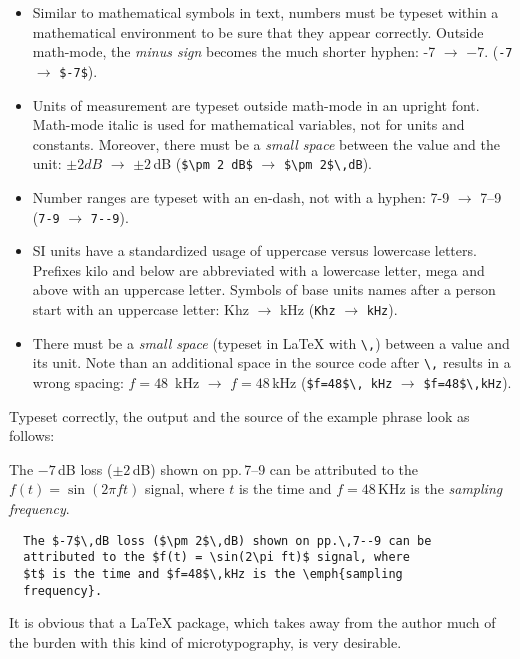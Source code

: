 \documentclass[12pt, a4paper]{scrartcl}
\begin{document}
\begin{itemize}
  \item Similar to mathematical symbols in text, numbers must be typeset
    within a mathematical environment to be sure that they appear
    correctly. Outside math-mode, the \emph{minus sign} becomes the much
    shorter hyphen: -7 $\rightarrow$ $-7$. (\verb|-7| $\rightarrow$
    \verb|$-7$|).
  \item Units of measurement are typeset outside math-mode in an
    upright font. Math-mode italic is used for mathematical variables,
    not for units and constants. Moreover, there must be a \emph{small
    space} between the value and the unit: $\pm 2 dB$ $\rightarrow$
    $\pm 2$\,dB (\verb|$\pm 2 dB$| $\rightarrow$ \verb|$\pm 2$\,dB|).
  \item Number ranges are typeset with an en-dash, not with a hyphen:
    7-9 $\rightarrow$ 7--9 (\verb|7-9| $\rightarrow$ \verb|7--9|).
  \item SI units have a standardized usage of uppercase versus
    lowercase letters. Prefixes kilo and below are abbreviated with a
    lowercase letter, mega and above with an uppercase letter. Symbols
    of base units names after a person start with an uppercase letter:
    Khz $\rightarrow$ kHz (\verb|Khz| $\rightarrow$ \verb|kHz|).
  \item There must be a \emph{small space} (typeset in \LaTeX{} with
    \verb|\,|) between a value and its unit. Note than an additional
    space in the source code after \verb|\,| results in a wrong
    spacing: $f=48$\, kHz $\rightarrow$  $f=48$\,kHz
    (\verb|$f=48$\, kHz| $\rightarrow$ \verb|$f=48$\,kHz|).
\end{itemize}
%
Typeset correctly, the output and the source of the example phrase
look as follows:
\begin{mdframed}[style=correct,frametitle=values and units]
  The $-7$\,dB loss ($\pm 2$\,dB) shown on pp.\,7--9 can be attributed to the
  $f(t) = \sin(2\pi ft)$ signal, where $t$ is the time and $f=48$\,KHz
  is the \emph{sampling frequency}.
\end{mdframed}
%
\begin{mdframed}[style=correct,frametitle=values and units (\LaTeX{} source)]
  \begin{lstlisting}
  The $-7$\,dB loss ($\pm 2$\,dB) shown on pp.\,7--9 can be
  attributed to the $f(t) = \sin(2\pi ft)$ signal, where
  $t$ is the time and $f=48$\,kHz is the \emph{sampling
  frequency}.
  \end{lstlisting}
\end{mdframed}
%
It is obvious that a \LaTeX{} package, which takes away from the author
much of the burden with this kind of microtypography, is very desirable.
\end{document}
